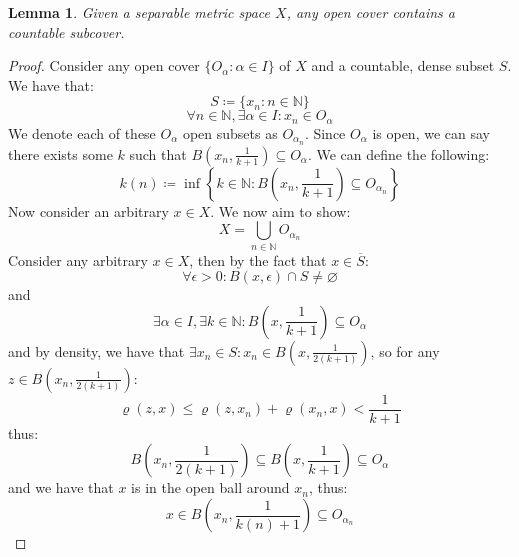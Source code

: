 \documentclass[10pt,letterpaper]{article} %
\newtheorem{lem}{Lemma}[section]
\begin{document}
\begin{lem}
Given a separable metric space $X$, any open cover contains a countable subcover.
\end{lem}
\begin{proof}
Consider any open cover $\{O_\alpha : \alpha \in I\}$ of $X$ and a countable, dense subset $S$. We have that:
\begin{equation*}
S \coloneq \{x_n : n \in \mathbb{N}\}
\end{equation*}
\begin{equation*}
\forall n \in \mathbb{N}, \exists \alpha \in I: x_n \in O_\alpha
\end{equation*}
We denote each of these $O_\alpha$ open subsets as $O_{\alpha_n}$. Since $O_\alpha$ is open, we can say there exists some $k$ such that $B\left(x_n, \frac{1}{k+1}\right) \subseteq O_\alpha$. We can define the following:
\begin{equation*}
k(n) \coloneq \inf\left\{k \in \mathbb{N}: B\left(x_n, \frac{1}{k+1}\right) \subseteq O_{\alpha_n}\right\}
\end{equation*}
Now consider an arbitrary $x \in X$. We now aim to show:
\begin{equation*}
X = \bigcup_{n \in \mathbb{N}}O_{\alpha_n}
\end{equation*}
Consider any arbitrary $x \in X$, then by the fact that $x \in \overline{S}$:
\begin{equation*}
\forall \epsilon > 0: B(x, \epsilon) \cap S \neq \varnothing
\end{equation*}
and
\begin{equation*}
\exists \alpha \in I, \exists k \in \mathbb{N}: B\left(x, \frac{1}{k+1}\right) \subseteq O_\alpha
\end{equation*}
and by density, we have that $\exists x_n \in S: x_n \in B\left(x, \frac{1}{2(k+1)}\right)$, so for any $z \in B\left(x_n, \frac{1}{2(k+1)}\right)$:
\begin{equation*}
\varrho(z, x) \leqslant \varrho(z, x_n) + \varrho(x_n, x) < \frac{1}{k+1}
\end{equation*}
thus:
\begin{equation*}
B\left(x_n, \frac{1}{2(k+1)}\right) \subseteq B\left(x, \frac{1}{k+1}\right) \subseteq O_\alpha
\end{equation*}
and we have that $x$ is in the open ball around $x_n$, thus:
\begin{equation*}
x \in B\left(x_n, \frac{1}{k(n)+1}\right) \subseteq O_{\alpha_n}
\end{equation*}
\end{proof}
\end{document}
